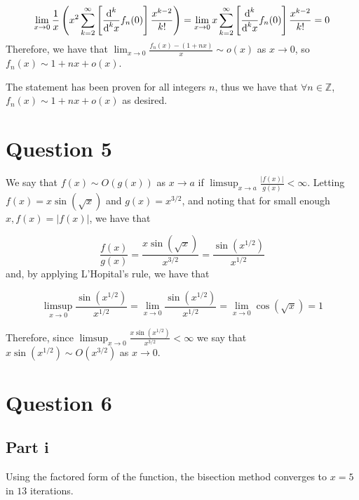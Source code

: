 \documentclass[12pt]{exam}
\newcommand{\diffd}{\textnormal{d}}
\begin{document}
\begin{equation}
\lim_{x\rightarrow 0}\frac{1}{x} \left(x^2\sum_{k=2}^{\infty} \left[\frac{\diffd^k}{\diffd^k x}f_n(0)\right] \frac{x^{k-2}}{k!}\right) =
  \lim_{x\rightarrow 0} x\sum_{k=2}^{\infty} \left[\frac{\diffd^k}{\diffd^k x}f_n(0)\right] \frac{x^{k-2}}{k!}=0 
\end{equation}
Therefore, we have that $\lim_{x\rightarrow 0} \frac{f_n(x)-(1+nx)}{x}\sim o(x)$ as $x\rightarrow 0$, so $f_n(x) \sim 1+nx+o(x)$.

The statement has been proven for all integers $n$, thus we have that $\forall n \in \mathbb{Z}$, $f_n(x) \sim 1+nx+o(x)$ as desired.
\newpage 

\section*{Question 5}

We say that $f(x) \sim O( g(x) )$ as $x\rightarrow a$  if $\limsup_{x\rightarrow a}\frac{|f(x)|}{g(x)} < \infty$. Letting $f(x)=x\sin(\sqrt{x})$ and $g(x) = x^{3/2}$, and noting that for small enough $x, f(x) = |f(x)|$, we have that 

\begin{equation}
\frac{f(x)}{g(x)} = \frac{x\sin(\sqrt{x})}{x^{3/2}} = \frac{\sin(x^{1/2})}{x^{1/2}}
\end{equation}
and, by applying L'Hopital's rule, we have that 

\begin{equation}
\limsup_{x\rightarrow 0}  \frac{\sin(x^{1/2})}{x^{1/2}} = \lim_{x\rightarrow 0}  \frac{\sin(x^{1/2})}{x^{1/2}} = \lim_{x\rightarrow 0} \cos( \sqrt{x} ) = 1
\end{equation}

Therefore, since $\limsup_{x\rightarrow 0}\frac{x\sin(x^{1/2})}{x^{3/2}} < \infty$ we say that $x\sin(x^{1/2}) \sim O( x^{3/2} )$ as $x\rightarrow 0$.

\newpage 

\section*{Question 6}

\subsection*{Part i}
Using the factored form of the function, the bisection method converges to $x=5$ in $13$ iterations. 
\end{document}
